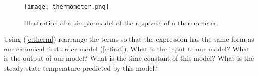 \begin{figure}[hbt]
\centering
\texttt{[image: thermometer.png]}
\caption{Illustration of a simple model of the response of a thermometer.}
\label{f:therm}
\end{figure}

\begin{ex}
Using (\ref{e:therm}) rearrange the terms so that the expression has the same form as our canonical first-order model (\ref{e:first}).    What is the input to our model?  What is the output of our model?  What is the time constant of this model?  What is the steady-state temperature predicted by this model?
\end{ex}

